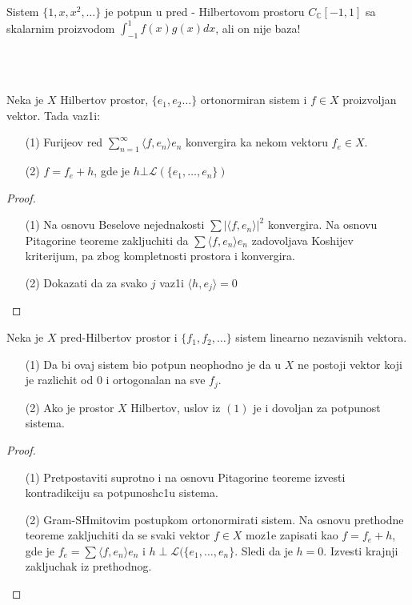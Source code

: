 \documentclass[a4paper,12pt]{article}
\newcommand{\CC}{\mathbb{C}}
\begin{document}
\begin{pr}
Sistem $\{1,x,x^2, \dots \}$ je potpun u pred - Hilbertovom prostoru $C_{\CC}[-1,1]$ sa skalarnim proizvodom $\int_{-1}^1 f(x) g(x) dx$, ali on nije baza!
\end{pr}
\\ \\
\begin{tma}
Neka je $X$ Hilbertov prostor, $\{e_1, e_2 \dots \}$ ortonormiran sistem i $f \in X$ proizvoljan vektor. Tada vaz1i:
\begin{itemize}
\item[(1)] Furijeov red $\sum_{n=1}^{\infty} \langle f, e_n \rangle e_n$ konvergira ka nekom vektoru $f_e \in X$.
\item[(2)] $f = f_e + h$, gde je $h \bot \mathcal{L}(\{e_1, \dots, e_n \})$
\end{itemize}
\end{tma}
\begin{proof}
\begin{itemize}
\item[(1)] Na osnovu Beselove nejednakosti $\sum {|\langle f, e_n \rangle |}^2$ konvergira. Na osnovu Pita\-go\-ri\-ne teoreme zakljuchiti da $\sum \langle f, e_n \rangle e_n $ zadovoljava Koshijev kriterijum, pa zbog kom\-ple\-tno\-sti prostora i konvergira.
\item[(2)] Dokazati da za svako $j$ vaz1i $\langle h, e_j \rangle = 0$
\end{itemize}
\end{proof}

\begin{tma}
Neka je $X$ pred-Hilbertov prostor i $\{f_1, f_2, \dots\}$ sistem linearno nezavisnih vektora.
\begin{itemize}
\item[(1)] Da bi ovaj sistem bio potpun neophodno je da u $X$ ne postoji vektor koji je razlichit od $0$ i ortogonalan na sve $f_j$.
\item[(2)] Ako je prostor $X$ Hilbertov, uslov iz $(1)$ je i dovoljan za potpunost sistema.
\end{itemize}
\end{tma}
\begin{proof}
\begin{itemize}
\item[(1)] Pretpostaviti suprotno i na osnovu Pitagorine teoreme izvesti kon\-tra\-dik\-ci\-ju sa potpunosh\-c1u sistema.
\item[(2)] Gram-SHmitovim postupkom ortonormirati sistem. Na osnovu prethodne teoreme zakljuchiti da se svaki vektor $f \in X$ moz1e zapisati kao $f = f_e + h$, gde je $f_e = \sum \langle f, e_n \rangle e_n$ i $h \perp \mathcal{L}(\{e_1, \dots, e_n\}$. Sledi da je $h = 0$. Izvesti krajnji zakljuchak iz prethodnog.
\end{itemize}
\end{proof}
\end{document}
